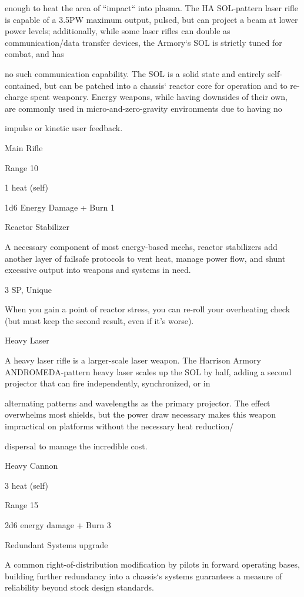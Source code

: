 enough to heat the area of “impact“ into plasma. The HA SOL-pattern laser rifle is capable of a 3.5PW
maximum output, pulsed, but can project a beam at lower power levels; additionally, while some laser rifles
can double as communication/data transfer devices, the Armory‘s SOL is strictly tuned for combat, and has

no such communication capability. The SOL is a solid state and entirely self-contained, but can be patched
into a chassis‘ reactor core for operation and to re-charge spent weaponry. Energy weapons, while having
downsides of their own, are commonly used in micro-and-zero-gravity environments due to having no

impulse or kinetic user feedback.

Main Rifle

Range 10

1 heat (self)

1d6 Energy Damage + Burn 1


Reactor Stabilizer

A necessary component of most energy-based mechs, reactor stabilizers add another layer of failsafe
protocols to vent heat, manage power flow, and shunt excessive output into weapons and systems in need.

3 SP, Unique




When you gain a point of reactor stress, you can re-roll your overheating check (but must keep
the second result, even if it’s worse).


Heavy Laser

A heavy laser rifle is a larger-scale laser weapon. The Harrison Armory ANDROMEDA-pattern heavy laser
scales up the SOL by half, adding a second projector that can fire independently, synchronized, or in

alternating patterns and wavelengths as the primary projector. The effect overwhelms most shields, but the
power draw necessary makes this weapon impractical on platforms without the necessary heat reduction/

dispersal to manage the incredible cost.

Heavy Cannon

3 heat (self)

Range 15

2d6 energy damage + Burn 3


Redundant Systems upgrade

A common right-of-distribution modification by pilots in forward operating bases, building further
redundancy into a chassis‘s systems guarantees a measure of reliability beyond stock design standards.

